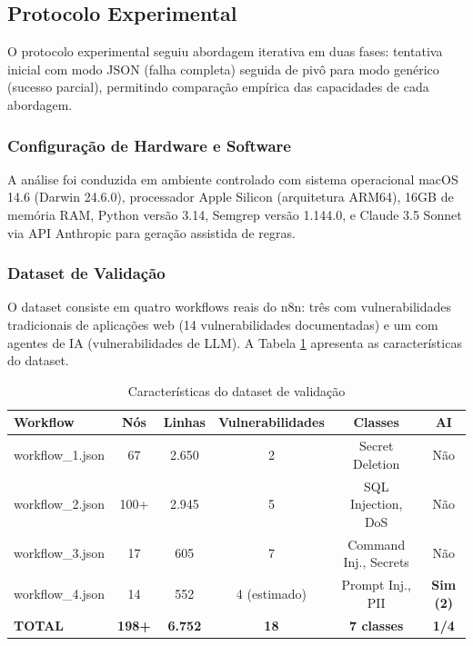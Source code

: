 \documentclass[12pt,a4paper]{article}
\begin{document}
\subsection{Protocolo Experimental}

O protocolo experimental seguiu abordagem iterativa em duas fases: tentativa inicial com modo JSON (falha completa) seguida de pivô para modo genérico (sucesso parcial), permitindo comparação empírica das capacidades de cada abordagem.

\subsubsection{Configuração de Hardware e Software}

A análise foi conduzida em ambiente controlado com sistema operacional macOS 14.6 (Darwin 24.6.0), processador Apple Silicon (arquitetura ARM64), 16GB de memória RAM, Python versão 3.14, Semgrep versão 1.144.0, e Claude 3.5 Sonnet via API Anthropic para geração assistida de regras.

\subsubsection{Dataset de Validação}

O dataset consiste em quatro workflows reais do n8n: três com vulnerabilidades tradicionais de aplicações web (14 vulnerabilidades documentadas) e um com agentes de IA (vulnerabilidades de LLM). A Tabela \ref{tab:dataset-validation} apresenta as características do dataset.

\begin{table}[H]
\centering
\caption{Características do dataset de validação}
\label{tab:dataset-validation}
\begin{tabular}{@{}lccccc@{}}
\toprule
\textbf{Workflow} & \textbf{Nós} & \textbf{Linhas} & \textbf{Vulnerabilidades} & \textbf{Classes} & \textbf{AI} \\ \midrule
workflow\_1.json & 67 & 2.650 & 2 & Secret Deletion & Não \\
workflow\_2.json & 100+ & 2.945 & 5 & SQL Injection, DoS & Não \\
workflow\_3.json & 17 & 605 & 7 & Command Inj., Secrets & Não \\
workflow\_4.json & 14 & 552 & 4 (estimado) & Prompt Inj., PII & \textbf{Sim (2)} \\
\textbf{TOTAL} & \textbf{198+} & \textbf{6.752} & \textbf{18} & \textbf{7 classes} & \textbf{1/4} \\ \bottomrule
\end{tabular}
\end{table}
\end{document}
